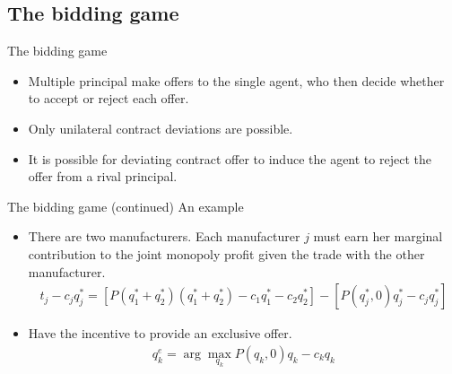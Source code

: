 \documentclass[aspectratio=169]{beamer}  %
\begin{document}
\subsection{The bidding game}
\begin{frame}{The bidding game}
    \begin{itemize}
        \item Multiple principal make offers to the single agent, who then decide whether to accept or reject each offer. \vspace{.2cm}
        \item Only unilateral contract deviations are possible. \vspace{.2cm}
        \item It is possible for deviating contract offer to induce the agent to reject the offer from a rival principal. \vspace{.2cm}
    \end{itemize}
\end{frame}



\begin{frame}{The bidding game (continued)}
    An example \vspace{.2cm}
    \begin{itemize}
        \item There are two manufacturers. Each manufacturer $j$ must earn her marginal contribution to the joint monopoly profit given the trade with the other manufacturer.
        \begin{align}
            t_j - c_j q_j^* = [ P(q_1^* + q_2^*)(q_1^* + q_2^*) - c_1 q_1^* - c_2 q_2^*] - [ P(q_j^*, 0)q_j^* - c_j q_j^*]
        \end{align}
        \item Have the incentive to provide an exclusive offer.
        \begin{align}
            q_k^e = \arg \max_{q_k} P(q_k, 0) q_k - c_k q_k
        \end{align}
    \end{itemize}
\end{frame}
\end{document}
